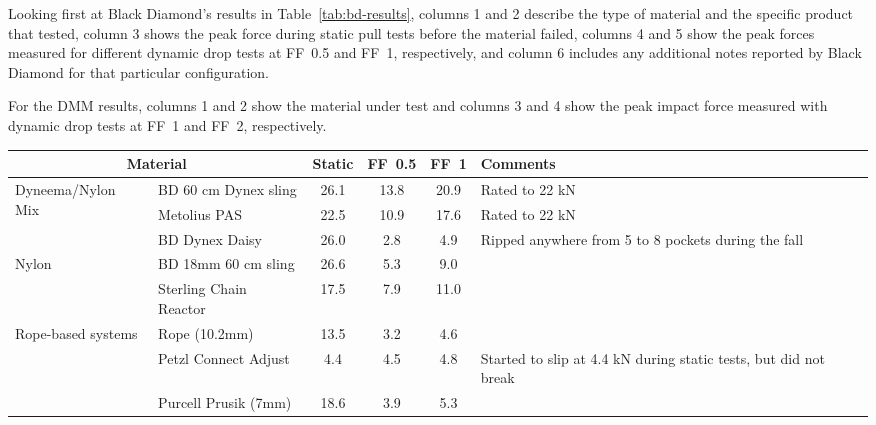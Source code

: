 \documentclass[nonacm,acmtog]{acmart}
\begin{document}
   Looking first at Black Diamond's results in Table~\ref{tab:bd-results},
   columns 1 and 2 describe the type of material and the specific product that
   tested, column 3 shows the peak force during static pull tests before the
   material failed, columns 4 and 5 show the peak forces measured for different
   dynamic drop tests at FF~0.5 and FF~1, respectively, and column 6 includes any
   additional notes reported by Black Diamond for that particular
   configuration.

   For the DMM results, columns 1 and 2 show the material under test and
   columns 3 and 4 show the peak impact force measured with dynamic drop tests
   at FF~1 and FF~2, respectively.

   \begin{table*}
      \centering
      \Small
      \begin{tabular}{|l|l||c|cc||l|}
      \hline
      \multicolumn{2}{|c||}{\bf Material} &
         {\bf Static} &
         {\bf FF~0.5} &
         {\bf FF~1} &
         {\bf Comments} \\
      \hline
      \multirow{3}{*}{Dyneema/Nylon Mix} &
         BD 60 cm Dynex sling &
         26.1 &
         13.8 &
         20.9 &
         Rated to 22 kN \\
         &
         Metolius PAS &
         22.5 &
         10.9 &
         17.6 &
         Rated to 22 kN \\
         &
         BD Dynex Daisy &
         26.0 &
         2.8 &
         4.9 &
         Ripped anywhere from 5 to 8 pockets during the fall \\
      \hline
      \multirow{2}{*}{Nylon} &
         BD 18mm 60 cm sling &
         26.6 &
         5.3 &
         9.0 &
         \\
         &
         Sterling Chain Reactor &
         17.5 &
         7.9 &
         11.0 &
         \\
      \hline
      \multirow{3}{*}{Rope-based systems} &
         Rope (10.2mm) &
         13.5 &
         3.2 &
         4.6 &
         \\
         &
         Petzl Connect Adjust &
         4.4 &
         4.5 &
         4.8 &
         Started to slip at 4.4 kN during static tests, but did not break \\
         &
         Purcell Prusik (7mm) &
         18.6 &
         3.9 &
         5.3 &
         \\
      \hline
      \end{tabular}
      \caption{Summary of Black Diamond's Static and Dynamic Drop Tests.  See
         \cite{bd-pull-tests} for full test results.}
      \label{tab:bd-results}
   \end{table*}
\end{document}
